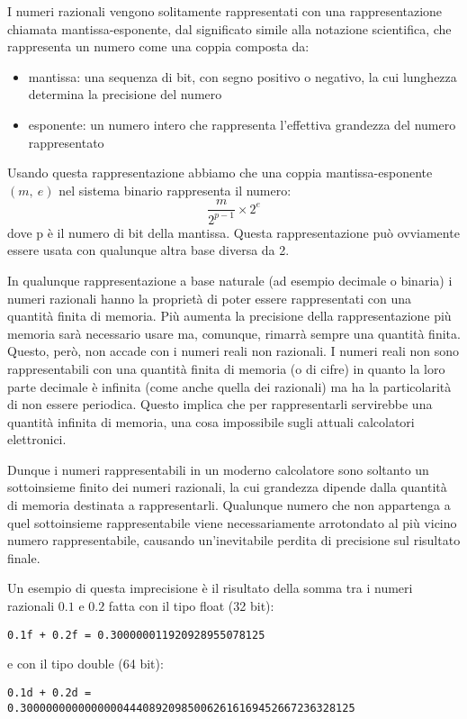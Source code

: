 \documentclass[Lau,oneside]{sapthesis}
\newcommand{\code}[1]{\colorbox{light-gray}{\texttt{#1}}}
\begin{document}
I numeri razionali vengono solitamente rappresentati con una rappresentazione 
chiamata mantissa-esponente, dal significato simile alla notazione 
scientifica, che rappresenta un numero come una coppia composta da:
\begin{itemize}
	\item mantissa: una sequenza di bit, con segno positivo o negativo, la cui 
lunghezza determina la precisione del numero
	\item esponente: un numero intero che rappresenta l'effettiva grandezza del 
numero rappresentato
\end{itemize}
Usando questa rappresentazione abbiamo che una coppia mantissa-esponente $\left(m,\ e\right)$ nel sistema binario rappresenta il numero:
$$\frac{m}{2^{p-1}} \times 2^e$$
dove p è il numero di bit della mantissa. Questa rappresentazione può ovviamente essere usata con qualunque altra base 
diversa da 2.

\medskip

In qualunque rappresentazione a base naturale (ad esempio decimale o binaria) i numeri razionali hanno la proprietà di poter essere rappresentati con una 
quantità finita di memoria. Più aumenta la precisione della rappresentazione più memoria sarà necessario usare ma, comunque, 
rimarrà sempre una quantità finita. Questo, però, non accade con i numeri 
reali non razionali. I numeri reali non sono rappresentabili con una quantità 
finita di memoria (o di cifre) in quanto la loro parte decimale è infinita (come 
anche quella dei razionali) ma ha la particolarità di non essere periodica. 
Questo implica che per rappresentarli servirebbe una quantità infinita di 
memoria, una cosa impossibile sugli attuali calcolatori elettronici.

Dunque i numeri rappresentabili in un moderno calcolatore sono soltanto un 
sottoinsieme finito dei numeri razionali, la cui grandezza dipende dalla quantità di 
memoria destinata a rappresentarli. Qualunque numero che non appartenga a quel 
sottoinsieme rappresentabile viene necessariamente arrotondato al più vicino 
numero rappresentabile, causando un'inevitabile perdita di precisione sul 
risultato finale.

Un esempio di questa imprecisione è il risultato della somma tra i numeri razionali $0.1$ e $0.2$ fatta con il tipo float (32 bit):
\begin{center}
\code{0.1f + 0.2f = 0.300000011920928955078125}
\end{center}
e con il tipo double (64 bit):
\begin{center}
\code{0.1d + 0.2d =}\\
\code{0.3000000000000000444089209850062616169452667236328125}
\end{center}
\end{document}
